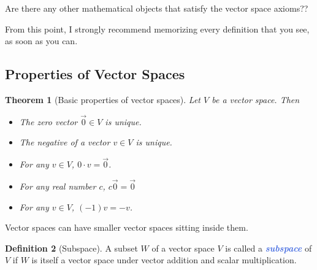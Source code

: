 \documentclass[10pt]{article}
\newcommand{\demph}[1]{\textcolor{RoyalBlue}{\textbf{\slshape #1}}} %
\newtheorem{theorem}{Theorem}
\theoremstyle{definition}
\newtheorem{definition}[theorem]{Definition}
\begin{document}
Are there any other mathematical objects that satisfy the vector space
axioms??

From this point, I strongly recommend memorizing every definition that you
see, as soon as you can.

\subsection{Properties of Vector Spaces}

\begin{theorem}[Basic properties of vector spaces]
  Let $V$ be a vector space. Then
  \begin{itemize}
    \item The zero vector $\vec{0}\in V$ is unique.
    \item The negative of a vector $v\in V$ is unique.
    \item For any $v\in V$, $0\cdot v=\vec{0}$.
    \item For any real number $c$, $c\vec{0}=\vec{0}$
    \item For any $v\in V$, $(-1)v=-v$.
  \end{itemize}
\end{theorem}

Vector spaces can have smaller vector spaces sitting inside them.

\begin{definition}[Subspace]
  \label{def:subspace}
  A subset $W$ of a vector space $V$ is called a \demph{subspace} of $V$ if
  $W$ is itself a vector space under vector addition and scalar multiplication.
\end{definition}
\end{document}
